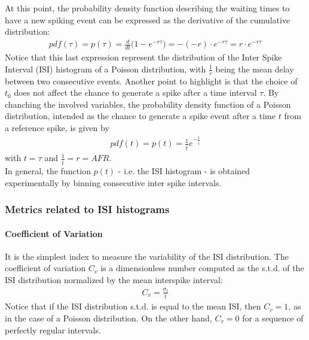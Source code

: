 At this point, the probability density function describing the waiting times to
have a new spiking event can be expressed as the derivative of the cumulative
distribution:
\begin{align*}
    pdf(\tau)
    =p(\tau)
    =\frac{d}{dt}\bigl(1-e^{-r\tau}\bigr)
    =-(-r)\cdot{e^{-r\tau}}
    =r\cdot{e^{-r\tau}}
\end{align*}
Notice that this last expression represent the distribution of the Inter Spike
Interval (ISI) histogram of a Poisson distribution, with \(\frac{1}{r}\) being
the mean delay between two consecutive events.
Another point to highlight is that the choice of \(t_0\) does not affect the chance
to generate a spike after a time interval \(\tau\).
By chanching the involved variables, the probability density function of a
Poisson distribution, intended as the chance to generate a spike event after a time
\(t\) from a reference spike, is given by
\begin{align*}
    pdf(t)
    =p(t)
    =\frac{1}{\overline{t}}e^{-\frac{t}{\overline{t}}}
\end{align*}
with \(t=\tau\) and \(\frac{1}{\overline{t}}=r=AFR\).\\
In general, the function \(p(t)\) - i.e. the ISI histogram - is obtained
experimentally by binning consecutive inter spike intervals.

\subsubsection{Metrics related to ISI histograms}
\paragraph{Coefficient of Variation}
It is the simplest index to measure the variability of the ISI distribution. The
coefficient of variation \(C_v\) is a dimensionless number computed as the
s.t.d. of the ISI distribution normalized by the mean interspike interval:
\begin{align*}
    C_v=\frac{\sigma_t}{\overline{t}}
\end{align*}
Notice that if the ISI distribution s.t.d. is equal to the mean ISI, then
\(C_v=1\), as in the case of a Poisson distribution. On the other hand,
\(C_v=0\) for a sequence of perfectly regular intervals.

